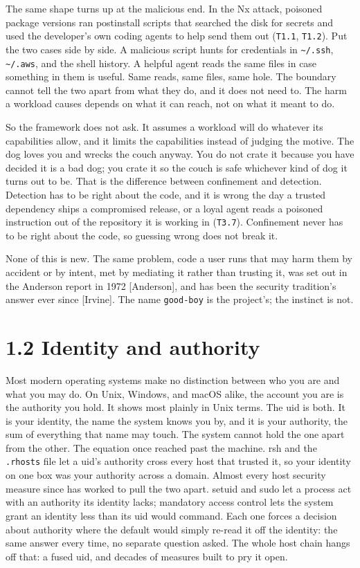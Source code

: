 The same shape turns up at the malicious end. In the Nx attack, poisoned
package versions ran postinstall scripts that searched the disk for
secrets and used the developer's own coding agents to help send them out
(\texttt{T1.1}, \texttt{T1.2}). Put the two cases side by side. A
malicious script hunts for credentials in
\texttt{\textasciitilde{}/.ssh}, \texttt{\textasciitilde{}/.aws}, and
the shell history. A helpful agent reads the same files in case
something in them is useful. Same reads, same files, same hole. The
boundary cannot tell the two apart from what they do, and it does not
need to. The harm a workload causes depends on what it can reach, not on
what it meant to do.

So the framework does not ask. It assumes a workload will do whatever
its capabilities allow, and it limits the capabilities instead of
judging the motive. The dog loves you and wrecks the couch anyway. You
do not crate it because you have decided it is a bad dog; you crate it
so the couch is safe whichever kind of dog it turns out to be. That is
the difference between confinement and detection. Detection has to be
right about the code, and it is wrong the day a trusted dependency ships
a compromised release, or a loyal agent reads a poisoned instruction out
of the repository it is working in (\texttt{T3.7}). Confinement never
has to be right about the code, so guessing wrong does not break it.

None of this is new. The same problem, code a user runs that may harm
them by accident or by intent, met by mediating it rather than trusting
it, was set out in the Anderson report in 1972 {[}Anderson{]}, and has
been the security tradition's answer ever since {[}Irvine{]}. The name
\texttt{good-boy} is the project's; the instinct is not.

\hypertarget{identity-and-authority}{%
\section{1.2 Identity and authority}\label{identity-and-authority}}

Most modern operating systems make no distinction between who you are
and what you may do. On Unix, Windows, and macOS alike, the account you
are is the authority you hold. It shows most plainly in Unix terms. The
uid is both. It is your identity, the name the system knows you by, and
it is your authority, the sum of everything that name may touch. The
system cannot hold the one apart from the other. The equation once
reached past the machine. rsh and the \texttt{.rhosts} file let a uid's
authority cross every host that trusted it, so your identity on one box
was your authority across a domain. Almost every host security measure
since has worked to pull the two apart. setuid and sudo let a process
act with an authority its identity lacks; mandatory access control lets
the system grant an identity less than its uid would command. Each one
forces a decision about authority where the default would simply re-read
it off the identity: the same answer every time, no separate question
asked. The whole host chain hangs off that: a fused uid, and decades of
measures built to pry it open.

